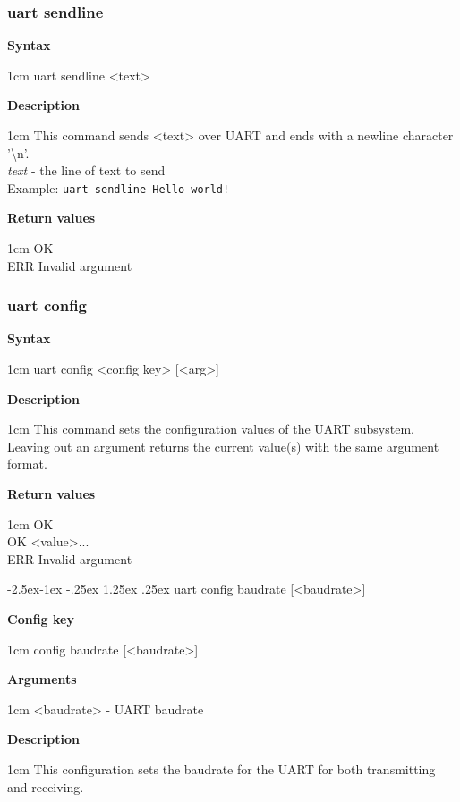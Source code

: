 \documentclass{article}[a4paper]
\makeatletter
\newcommand\subsubsubsection{\@startsection{paragraph}{4}{\z@}%
            {-2.5ex\@plus -1ex \@minus -.25ex}%
            {1.25ex \@plus .25ex}%
            {\normalfont\normalsize\bfseries}}
\makeatother
\begin{document}
\subsubsection{uart sendline}
\begin{tcolorbox}
	{\bf Syntax}

	 1cm \dimexpr\linewidth-2cm\relax
	uart sendline <text>

	\medskip
	{\bf Description}

	 1cm \dimexpr\linewidth-2cm\relax
	This command sends <text> over UART and ends with a newline character '\textbackslash n'.
	\medskip \\
	{\it text} - the line of text to send \\

	\medskip
	Example: \texttt{uart sendline Hello world!}

	\medskip
	{\bf Return values}

	 1cm \dimexpr\linewidth-2cm\relax
	OK \\
	ERR Invalid argument
\end{tcolorbox}

\subsubsection{uart config}
\begin{tcolorbox}
	{\bf Syntax}

	 1cm \dimexpr\linewidth-2cm\relax
	uart config <config key> [<arg>]

	\medskip
	{\bf Description}

	 1cm \dimexpr\linewidth-2cm\relax
	This command sets the configuration values of the UART subsystem.
	Leaving out an argument returns the current value(s) with the same argument
	format.

	\medskip
	{\bf Return values}

	 1cm \dimexpr\linewidth-2cm\relax
	OK \\
	OK <value>... \\
	ERR Invalid argument
\end{tcolorbox}

\subsubsubsection{uart config baudrate [<baudrate>]}
\begin{tcolorbox}
	{\bf Config key}

	 1cm \dimexpr\linewidth-2cm\relax
	config baudrate [<baudrate>]

	\medskip
	{\bf Arguments}

	 1cm \dimexpr\linewidth-2cm\relax
	<baudrate> - UART baudrate

	\medskip
	{\bf Description}

	 1cm \dimexpr\linewidth-2cm\relax
	This configuration sets the baudrate for the UART for both transmitting and
	receiving.
\end{tcolorbox}
\end{document}
